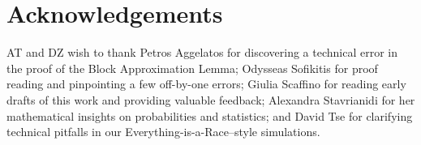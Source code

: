 \section{Acknowledgements}

AT and DZ wish to thank
Petros Aggelatos for discovering a technical error in the
proof of the Block Approximation Lemma;
Odysseas Sofikitis for proof reading and pinpointing a few off-by-one errors;
Giulia Scaffino for reading early drafts
of this work and providing valuable feedback;
Alexandra Stavrianidi for her mathematical insights on probabilities and statistics;
and David Tse for clarifying technical pitfalls in our Everything-is-a-Race--style
simulations.